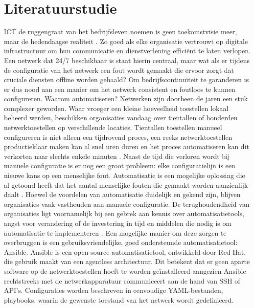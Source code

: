 
\section{Literatuurstudie}%
\label{sec:literatuurstudie}

ICT de ruggengraat van het bedrijfsleven noemen is geen toekomstvisie meer, maar de hedendaagse realiteit \autocite{OlalereAbiodun2023}. 
Zo goed als elke organisatie vertrouwt op digitale infrastructuur om hun communicatie en dienstverlening efficiënt te laten verlopen.
Een netwerk dat 24/7 beschikbaar is staat hierin centraal, maar wat als er tijdens de configuratie van het netwerk een fout wordt gemaakt die ervoor zorgt dat cruciale diensten offline worden gehaald?
Om bedrijfscontinuïteit te garanderen is er dus nood aan een manier om het netwerk consistent en foutloos te kunnen configureren.
Waarom automatiseren? Netwerken zijn doorheen de jaren een stuk complexer geworden. Waar vroeger een kleine hoeveelheid toestellen lokaal beheerd werden, beschikken organisaties vandaag over tientallen of honderden netwerktoestellen op verschillende locaties. 
Tientallen toestellen manueel configureren is niet alleen een tijdrovend proces, een reeks netwerktoestellen productieklaar maken kan al snel uren duren en het proces automatiseren kan dit verkorten naar slechts enkele minuten \autocite{Younes2024}.
Naast de tijd die verloren wordt bij manuele configuratie is er nog een groot probleem: elke configuratielijn is een nieuwe kans op een menselijke fout. 
Automatisatie is een mogelijke oplossing die al getoond heeft dat het aantal menselijke fouten die gemaakt worden aanzienlijk daalt \autocite{Diekmann_2015}.
Hoewel de voordelen van automatisatie duidelijk en gekend zijn, blijven organisaties vaak vasthouden aan manuele configuratie. 
De terughoudendheid van organisaties ligt voornamelijk bij een gebrek aan kennis over automatisatietools, angst voor verandering of de investering in tijd en middelen die nodig is om automatisatie te implementeren \autocite{EMAItential2021}.
Een mogelijke manier om deze zorgen te overbruggen is een gebruiksvriendelijke, goed ondersteunde automatisatietool: Ansible.
Ansible is een open-source automatisatietool, ontwikkeld door Red Hat, die gebruik maakt van een agentless architectuur.
Dit betekent dat er geen aparte software op de netwerktoestellen hoeft te worden geïnstalleerd aangezien Ansible rechtstreeks met de netwerkapparatuur communiceert aan de hand van SSH of API's. Configuraties worden beschreven in eenvoudige YAML-bestanden, playbooks, waarin de gewenste toestand van het netwerk wordt gedefinieerd.
